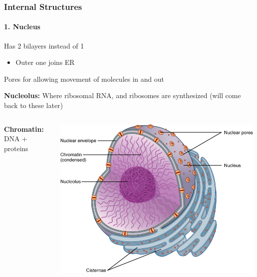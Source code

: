 \documentclass[10pt]{beamer}
\begin{document}
\begin{frame}[t]
\frametitle{Internal Structures}
\framesubtitle{1. Nucleus}
\vspace{0.25cm}

	Has 2 bilayers instead of 1
		\begin{itemize}
			\item Outer one joins ER
		\end{itemize}
	
	\vspace{0.25cm}
	
	Pores for allowing movement of molecules in and out\\
	
	\vspace{0.25cm}
	
	\textbf{Nucleolus:} Where ribosomal RNA, and ribosomes are synthesized (will come back to these later)\\
	
	\begin{columns}
		\begin{column}{0.5\textwidth}
			\textbf{Chromatin:} DNA + proteins
		\end{column}
		
		\begin{column}{0.5\textwidth}
			\begin{center}
				\includegraphics[width=1.0\textwidth]{figures/nucleus.jpg}
			\end{center}
		\end{column}
	\end{columns}
\end{frame}
\end{document}
